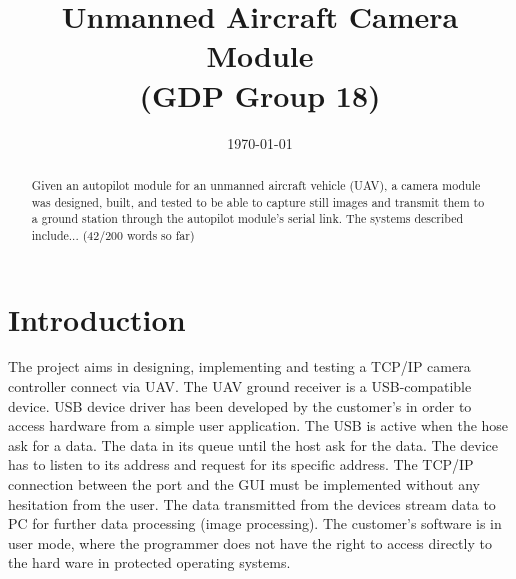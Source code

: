 \documentclass[oneside]{ecsgdp}         %
\begin{document}
\frontmatter
\title      {Unmanned Aircraft Camera Module \\(GDP Group 18)}
\date       {\today}
\subject    {ELEC6050 Group Design Project}
\maketitle
\begin{abstract}
Given an autopilot module for an unmanned aircraft vehicle (UAV), a camera module was designed, built, and tested to be able to capture still images and transmit them to a ground station through the autopilot module's serial link. The systems described include... (42/200 words so far)
\end{abstract}
\tableofcontents
\listoffigures
\listoftables
\lstlistoflistings
{}
\mainmatter

\chapter{Introduction}
The project aims in designing, implementing and testing a TCP/IP camera controller connect via UAV. The UAV ground receiver is a USB-compatible device. USB device driver has been developed by the customer’s in order to access hardware from a simple user application. The USB is active when the hose ask for a data. The data in its queue until the host ask for the data. The device has to listen to its address and request for its specific address. The TCP/IP connection between the port and the GUI must be implemented without any hesitation from the user. The data transmitted from the devices stream data to PC for further data processing (image processing).  The customer’s software is in user mode, where the programmer does not have the right to access directly to the hard ware in protected operating systems. 
\end{document}
